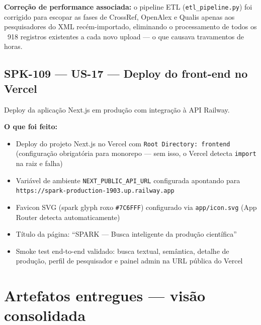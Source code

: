 \documentclass[12pt,a4paper]{article}
\begin{document}
\textbf{Correção de performance associada:} o pipeline ETL (\texttt{etl\_pipeline.py}) foi corrigido
para escopar as fases de CrossRef, OpenAlex e Qualis apenas aos pesquisadores do XML recém-importado,
eliminando o processamento de todos os ~918 registros existentes a cada novo upload — o que causava
travamentos de horas.

\subsection{SPK-109 — US-17 — Deploy do front-end no Vercel}

Deploy da aplicação Next.js em produção com integração à API Railway.

\textbf{O que foi feito:}
\begin{itemize}[noitemsep]
  \item Deploy do projeto Next.js no Vercel com \texttt{Root Directory: frontend} (configuração
        obrigatória para monorepo — sem isso, o Vercel detecta \texttt{import} na raiz e falha)
  \item Variável de ambiente \texttt{NEXT\_PUBLIC\_API\_URL} configurada apontando para
        \texttt{https://spark-production-1903.up.railway.app}
  \item Favicon SVG (spark glyph roxo \texttt{\#7C6FFF}) configurado via \texttt{app/icon.svg}
        (App Router detecta automaticamente)
  \item Título da página: ``SPARK — Busca inteligente da produção científica''
  \item Smoke test end-to-end validado: busca textual, semântica, detalhe de produção, perfil de
        pesquisador e painel admin na URL pública do Vercel
\end{itemize}

\section{Artefatos entregues — visão consolidada}
\end{document}
